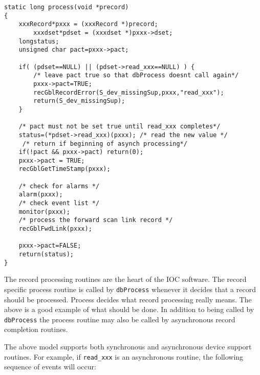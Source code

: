 \begin{verbatim}
static long process(void *precord)
{
    xxxRecord*pxxx = (xxxRecord *)precord;
        xxxdset*pdset = (xxxdset *)pxxx->dset;
    longstatus;
    unsigned char pact=pxxx->pact;

    if( (pdset==NULL) || (pdset->read_xxx==NULL) ) {
        /* leave pact true so that dbProcess doesnt call again*/
        pxxx->pact=TRUE;
        recGblRecordError(S_dev_missingSup,pxxx,"read_xxx");
        return(S_dev_missingSup);
    }

    /* pact must not be set true until read_xxx completes*/
    status=(*pdset->read_xxx)(pxxx); /* read the new value */
     /* return if beginning of asynch processing*/
    if(!pact && pxxx->pact) return(0);
    pxxx->pact = TRUE;
    recGblGetTimeStamp(pxxx);

    /* check for alarms */
    alarm(pxxx);
    /* check event list */
    monitor(pxxx);
    /* process the forward scan link record */
    recGblFwdLink(pxxx);

    pxxx->pact=FALSE;
    return(status);
}
\end{verbatim}The record processing routines are the heart of the IOC software. The record specific process routine is called by 
\verb|dbProcess| whenever it decides that a record should be processed. Process decides what record processing really means. 
The above is a good example of what should be done. In addition to being called by \verb|dbProcess| the process routine may 
also be called by asynchronous record completion routines.

The above model supports both synchronous and asynchronous device support routines. For example, if \verb|read_xxx| is an 
asynchronous routine, the following sequence of events will occur:

